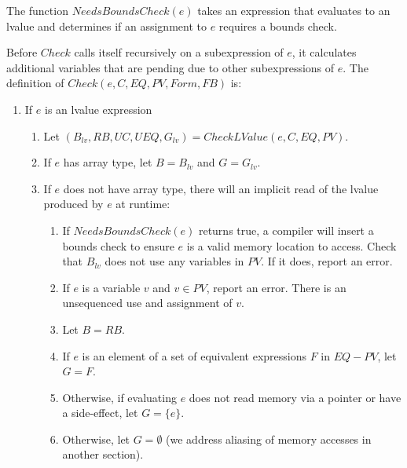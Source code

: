 The function $NeedsBoundsCheck(e)$ takes
an expression that evaluates to an lvalue and determines if an 
assignment to $e$ requires a bounds check.

Before $Check$ calls itself recursively on a subexpression of $e$, it calculates 
additional variables that are pending due to other subexpressions of $e$.
The definition of $Check(e, C, EQ, PV, Form, FB)$ is:
\begin{enumerate}
\item If $e$ is an lvalue expression
\begin{enumerate}
\item Let $(B_{lv}, RB, UC, UEQ, G_{lv}) = CheckLValue(e, C, EQ,PV)$.
\item If $e$ has array type, let $B = B_{lv}$ and $G = G_{lv}$.
\item If $e$ does not have array type, there will an implicit read of the lvalue produced by $e$
at runtime:
\begin{enumerate}
\item If $NeedsBoundsCheck(e)$ returns true, a compiler will insert a bounds check 
to ensure $e$ is a valid memory location to access.  Check that $B_{lv}$ does not use any variables in 
$PV$.  If it does, report an error.
\item If $e$ is a variable $v$ and $v \in PV$, report an error.  There is an unsequenced use and
assignment of $v$.
\item Let $B = RB$. 
\item If $e$ is an element of a set of equivalent expressions $F$ in $EQ - PV$, let $G = F$. 
\item Otherwise, if evaluating $e$ does not read memory via a pointer or have a side-effect, let $G = \{ e \}$.  
\item Otherwise, let $G = \emptyset$ (we address aliasing of memory accesses in another section).
\end{enumerate}
\end{enumerate}



\end{enumerate}
